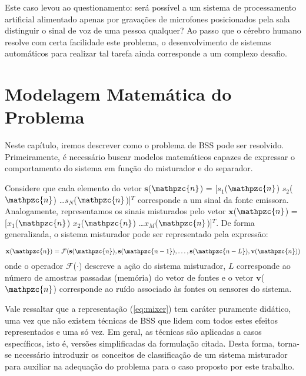     Este caso levou ao questionamento: será possível a um sistema de processamento artificial alimentado apenas por gravações de microfones posicionados pela sala distinguir o sinal de voz de uma pessoa qualquer? Ao passo que o cérebro humano resolve com certa facilidade este problema, o desenvolvimento de sistemas automáticos para realizar tal tarefa ainda corresponde a um complexo desafio.

\section{Modelagem Matemática do Problema}\label{sec:model}
    Neste capítulo, iremos descrever como o problema de BSS pode ser resolvido. Primeiramente, é necessário buscar modelos matemáticos capazes de expressar o comportamento do sistema em função do misturador e do separador.
    
    Considere que cada elemento do vetor $\mathbf{s}$($\mathpzc{n}$) = [${s_1}$($\mathpzc{n}$) ${s_2}$($\mathpzc{n}$) \dots  $s_N$($\mathpzc{n}$)]$^T$ corresponde a um sinal da fonte emissora. Analogamente, representamos os sinais misturados pelo vetor  $\mathbf{x}$($\mathpzc{n}$) = [${x_1}$($\mathpzc{n}$) ${x_2}$($\mathpzc{n}$) \dots  ${x_M}$($\mathpzc{n}$)]$^T$. De forma generalizada, o sistema misturador pode ser representado pela expressão:

    \begin{equation}\label{eq:mixer}
        \mathbf{x}(\mathpzc{n}) = \mathcal{F}(\mathbf{s}(\mathpzc{n}), \mathbf{s}(\mathpzc{n-1}), \dots, \mathbf{s}(\mathpzc{n - L}), \mathbf{v}(\mathpzc{n}))
    \end{equation}
    onde o operador $\mathcal{F}$($\cdot$) descreve a ação do sistema misturador, $L$ corresponde ao número de amostras passadas (memória) do vetor de fontes e o vetor $\mathbf{v}$($\mathpzc{n}$) corresponde ao ruído associado às fontes ou sensores do sistema.
    
    Vale ressaltar que a representação (\ref{eq:mixer}) tem caráter puramente didático, uma vez que não existem técnicas de BSS que lidem com todos estes efeitos representados e uma só vez. Em geral, as técnicas são aplicadas a casos específicos, isto é, versões simplificadas da formulação citada. Desta forma, torna-se necessário introduzir os conceitos de classificação de um sistema misturador para auxiliar na adequação do problema para o caso proposto por este trabalho.
    
